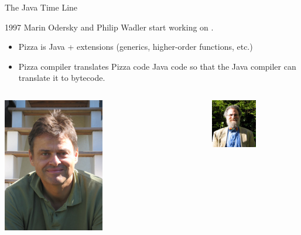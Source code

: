 \begin{frame}{The Java Time Line}
\begin{block}{1997}
Marin Odersky and Philip Wadler start working on .
\begin{itemize}
\item Pizza is Java + extensions (generics, higher-order functions, etc.)
\item Pizza compiler translates Pizza  code 
Java  code so that the Java compiler can translate it to bytecode.
\end{itemize}
\end{block}
\begin{columns}
	\begin{center}
	\includegraphics[width=0.5\textwidth]{resources/MartinOdersky.jpg}
	\end{center}
	\begin{center}
	\includegraphics[width=0.5\textwidth]{resources/PhilipWadler.jpg}
	\end{center}
\end{columns}
\end{frame}

